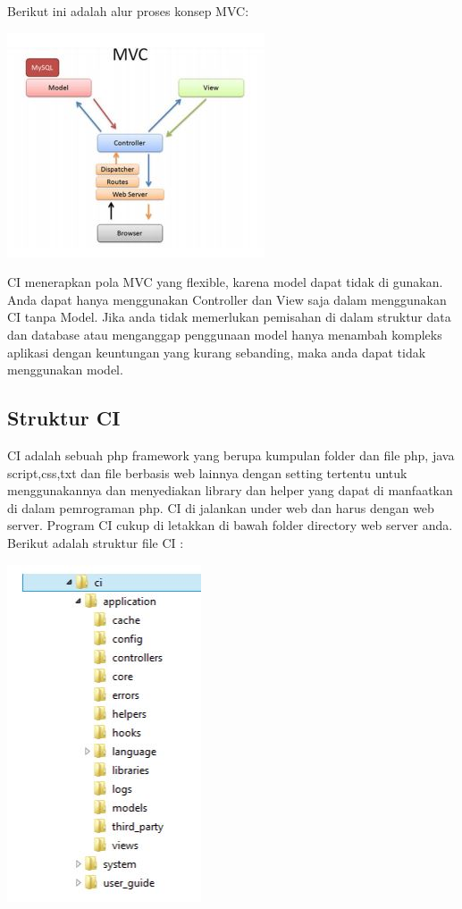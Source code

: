 	Berikut ini adalah alur proses konsep MVC:
	
	\includegraphics[scale=1.00]{Gambar/konsepMVC}
	
	CI menerapkan pola MVC yang flexible, karena model dapat tidak di gunakan. Anda dapat hanya menggunakan Controller dan View saja dalam menggunakan CI
	tanpa Model. Jika anda tidak memerlukan pemisahan di dalam struktur data dan database atau menganggap penggunaan model hanya menambah kompleks aplikasi dengan keuntungan yang kurang sebanding, maka anda dapat tidak menggunakan model.
	
	\subsection{Struktur CI}
	\label{sub: strukturCI}
	CI adalah sebuah php framework yang berupa kumpulan folder dan file php, java script,css,txt dan file berbasis web lainnya dengan setting tertentu untuk menggunakannya dan menyediakan library dan helper yang dapat di manfaatkan di dalam pemrograman php. CI di jalankan under web dan harus dengan web server. Program CI cukup di letakkan di bawah folder directory web server anda.
	Berikut adalah struktur file CI :
	
	\includegraphics[scale=1]{Gambar/strukturCI}
		

